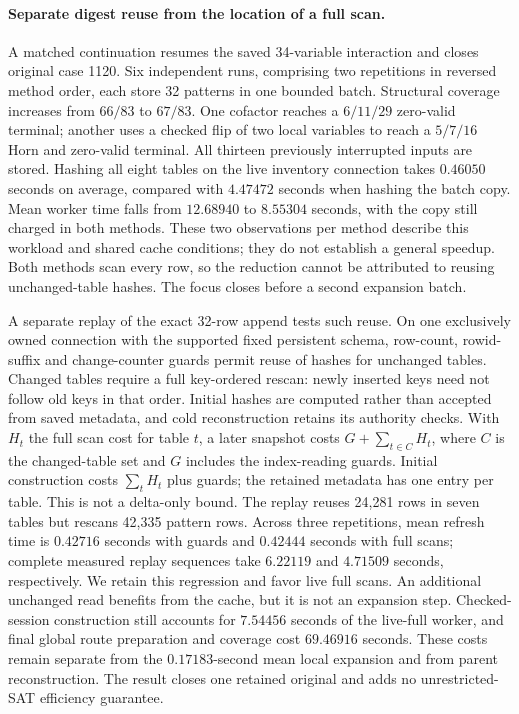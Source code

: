 \documentclass[11pt,a4paper]{article}
\numberwithin{equation}{section}
\theoremstyle{plain}
\theoremstyle{definition}
\theoremstyle{remark}
\begin{document}
\paragraph{Separate digest reuse from the location of a full scan.}
A matched continuation resumes the saved 34-variable interaction and closes
original case 1120. Six independent runs, comprising two repetitions in reversed
method order, each store 32 patterns in one bounded batch. Structural coverage
increases from $66/83$ to $67/83$. One cofactor reaches a $6/11/29$ zero-valid
terminal; another uses a checked flip of two local variables to reach a $5/7/16$
Horn and zero-valid terminal. All thirteen previously interrupted inputs are
stored. Hashing all eight tables on the live inventory
connection takes $0.46050$ seconds on average, compared with $4.47472$ seconds
when hashing the batch copy. Mean worker time falls from $12.68940$ to
$8.55304$ seconds, with the copy still charged in both methods. These two
observations per method describe this workload and shared cache conditions;
they do not establish a general speedup. Both methods scan every row, so the
reduction cannot be attributed to reusing unchanged-table hashes. The focus
closes before a second expansion batch.

A separate replay of the exact 32-row append tests such reuse. On one exclusively
owned connection with the supported fixed persistent schema, row-count,
rowid-suffix and change-counter guards permit reuse of hashes for unchanged
tables. Changed tables require a full key-ordered rescan: newly inserted keys
need not follow old keys in that order. Initial hashes are computed rather than
accepted from saved metadata, and cold reconstruction retains its authority
checks. With $H_t$ the full scan cost for table $t$, a later snapshot costs
$G+\sum_{t\in C}H_t$, where $C$ is the changed-table set and $G$ includes the
index-reading guards. Initial construction costs $\sum_t H_t$ plus guards;
the retained metadata has one entry per table. This is not a delta-only bound.
The replay reuses 24,281 rows in seven tables but rescans 42,335 pattern rows.
Across three repetitions, mean refresh time is $0.42716$ seconds with guards
and $0.42444$ seconds with full scans; complete measured replay sequences take
$6.22119$ and $4.71509$ seconds, respectively. We retain this regression and
favor live full scans. An additional unchanged read benefits from the cache,
but it is not an expansion step. Checked-session construction still accounts
for $7.54456$ seconds of the live-full worker, and final global route preparation
and coverage cost $69.46916$ seconds. These costs remain separate from the
$0.17183$-second mean local expansion and from parent reconstruction. The result
closes one retained original and adds no unrestricted-SAT efficiency guarantee.
\end{document}
